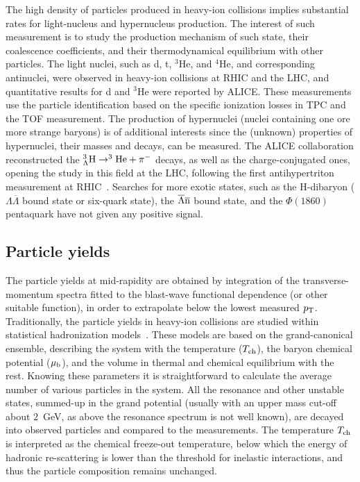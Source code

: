 The high density of particles produced in heavy-ion collisions implies substantial rates for light-nucleus and hypernucleus production. The interest of such measurement is to study the production mechanism of such state, their coalescence coefficients, and their thermodynamical equilibrium with other particles. The light nuclei, such as d, t, $^3$He, and $^4$He, and corresponding antinuclei, were observed in heavy-ion collisions at RHIC and the LHC, and quantitative results for d and $^3$He were reported by ALICE. These measurements use the particle identification based on the specific ionization losses in TPC and the TOF measurement. The production of hypernuclei (nuclei containing one ore more strange baryons) is of additional interests since the (unknown) properties of hypernuclei, their masses and decays, can be measured. The ALICE collaboration reconstructed the $^3_{\Lambda}{\rm H} \rightarrow ^3{\rm He} + \pi^-$ decays, as well as the charge-conjugated ones, opening the study in this field at the LHC, following the first antihypertriton measurement at RHIC~\cite{Abelev:2010rv}. Searches for more exotic states, such as the H-dibaryon ($\Lambda\overline{\Lambda}$ bound state or six-quark state), the $\overline{\Lambda}\overline{\rm n}$ bound state, and the $\Phi(1860)$ pentaquark have not given any positive signal.
\subsection{Particle yields}
\label{subsecks:yields}
The particle yields at mid-rapidity are obtained by integration of the transverse-momentum spectra fitted to the blast-wave functional dependence (or other suitable function), in order to extrapolate below the lowest measured $p_{\rm T}$. Traditionally, the particle yields in heavy-ion collisions are studied within statistical hadronization models~\cite{Andronic:2008gu,Andronic:2011yq,Cleymans:1998fq,Becattini:2009fv}. These models are based on the grand-canonical ensemble, describing the system with the temperature ($T_{\rm ch}$), the baryon chemical potential ($\mu_{\rm b}$), and the volume in thermal and chemical equilibrium with the rest. Knowing these parameters it is straightforward to calculate the average number of various particles in the system. All the resonance and other unstable states, summed-up in the grand potential (usually with an upper mass cut-off about $2$~GeV, as above the resonance spectrum is not well known), are decayed into observed particles and compared to the measurements. The temperature $T_{\rm ch}$ is interpreted as the chemical freeze-out temperature, below which the energy of hadronic re-scattering is lower than the threshold for inelastic interactions, and thus the particle composition remains unchanged.

